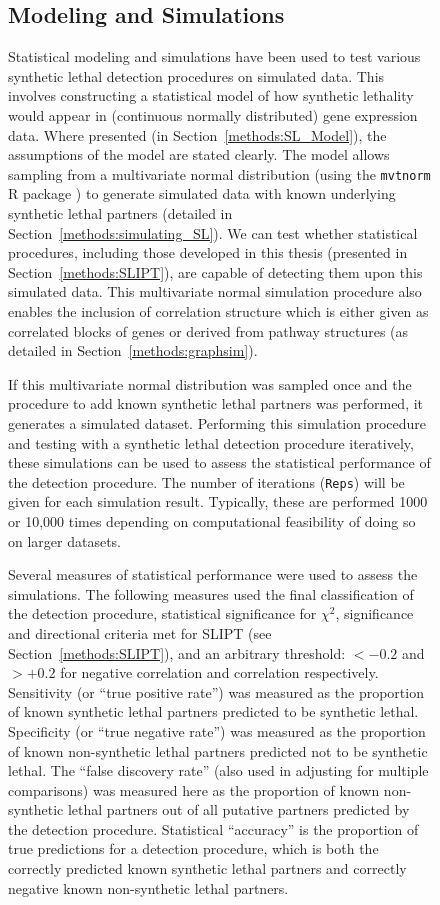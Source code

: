 \begin{figure}[!htp]
\subsection{Modeling and Simulations} \label{methods:simulation}
Statistical modeling and simulations have been used to test various synthetic lethal detection procedures on simulated data. This involves constructing a statistical model of how synthetic lethality would appear in (continuous normally distributed) gene expression data. Where presented (in Section~\ref{methods:SL_Model}), the assumptions of the model are stated clearly. The model allows sampling from a multivariate normal distribution (using the \texttt{mvtnorm} R package \citep{Genz2009, mvtnorm}) to generate simulated data with known underlying synthetic lethal partners (detailed in Section~\ref{methods:simulating_SL}). We can test whether statistical procedures, including those developed in this thesis (presented in Section~\ref{methods:SLIPT}), are capable of detecting them upon this simulated data. This multivariate normal simulation procedure also enables the inclusion of correlation structure which is either given as correlated blocks of genes or derived from pathway structures (as detailed in Section~\ref{methods:graphsim}).

If this multivariate normal distribution was sampled once and the procedure to add known synthetic lethal partners was performed, it generates a simulated dataset. Performing this simulation procedure and testing with a synthetic lethal detection procedure iteratively, these simulations can be used to assess the statistical performance of the detection procedure. The number of iterations (\texttt{Reps}) will be given for each simulation result. Typically, these are performed 1000 or 10,000 times depending on computational feasibility of doing so on larger datasets. 

Several measures of statistical performance were used to assess the simulations. The following measures used the final classification of the detection procedure, statistical significance for $\chi^2$, significance and directional criteria met for SLIPT (see Section~\ref{methods:SLIPT}), and an arbitrary threshold: $<-0.2$ and $>+0.2$ for  negative correlation and correlation respectively. Sensitivity (or ``true positive rate'') was measured as the proportion of known synthetic lethal partners predicted to be synthetic lethal. Specificity (or ``true negative rate'') was measured as the proportion of known non-synthetic lethal partners predicted not to be synthetic lethal. The ``false discovery rate'' (also used in adjusting for multiple comparisons) was measured here as the proportion of known non-synthetic lethal partners out of all putative partners predicted by the detection procedure. Statistical ``accuracy'' is the proportion of true predictions for a detection procedure, which is both the correctly predicted known synthetic lethal partners and correctly negative known non-synthetic lethal partners.


\end{figure}
